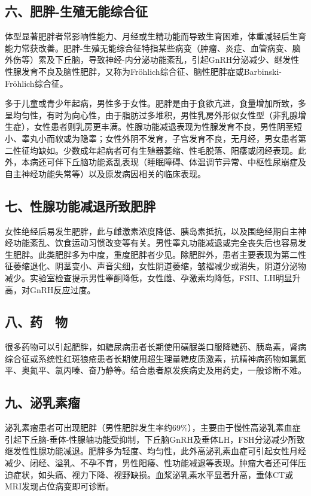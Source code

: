 \subsection{六、肥胖-生殖无能综合征}

体型显著肥胖者常影响性能力、月经或生精功能而导致生育困难，体重减轻后生育能力常获改善。肥胖-生殖无能综合征特指某些病变（肿瘤、炎症、血管病变、脑外伤等）累及下丘脑，导致神经-内分泌功能紊乱，引起GnRH分泌减少、继发性性腺发育不良及脑性肥胖，又称为Fröhlich综合征、脑性肥胖症或Barbinski-Fröhlich综合征。

多于儿童或青少年起病，男性多于女性。肥胖是由于食欲亢进，食量增加所致，多呈均匀性，有时为向心性，由于脂肪过多堆积，男性乳房外形似女性型（非乳腺增生症），女性患者则乳房更丰满。性腺功能减退表现为性腺发育不良，男性阴茎短小、睾丸小而软或为隐睾；女性外阴不发育，子宫发育不良，无月经，男女患者第二性征均缺如。少数成年起病者可有生殖器萎缩、性毛脱落、阳痿或闭经表现。此外，本病还可伴下丘脑功能紊乱表现（睡眠障碍、体温调节异常、中枢性尿崩症及自主神经功能失常等）以及原发病因相关的临床表现。

\subsection{七、性腺功能减退所致肥胖}

女性绝经后易发生肥胖，此与雌激素浓度降低、胰岛素抵抗，以及围绝经期自主神经功能紊乱、饮食运动习惯改变等有关。男性睾丸功能减退或完全丧失后也容易发生肥胖。此类肥胖多为中度，重度肥胖者少见。除肥胖外，患者主要表现为第二性征萎缩退化、阴茎变小、声音尖细，女性阴道萎缩，皱褶减少或消失，阴道分泌物减少。实验室检查提示男性睾酮降低，女性雌、孕激素均降低，FSH、LH明显升高，对GnRH反应过度。

\subsection{八、药　物}

很多药物可以引起肥胖，如糖尿病患者长期使用磺脲类口服降糖药、胰岛素，肾病综合征或系统性红斑狼疮患者长期使用超生理量糖皮质激素，抗精神病药物如氯氮平、奥氮平、氯丙嗪、奋乃静等。结合患者原发疾病史及用药史，一般诊断不难。

\subsection{九、泌乳素瘤}

泌乳素瘤患者可出现肥胖（男性肥胖发生率约69\%），主要由于慢性高泌乳素血症引起下丘脑-垂体-性腺轴功能受抑制，下丘脑GnRH及垂体LH，FSH分泌减少所致继发性性腺功能减退。肥胖多为轻度、均匀性，此外高泌乳素血症可引起女性月经减少、闭经、溢乳、不孕不育，男性阳痿、性功能减退等表现。肿瘤大者还可伴压迫症状，如头痛、视力下降、视野缺损。血浆泌乳素水平显著升高，垂体CT或MRI发现占位病变即可诊断。

